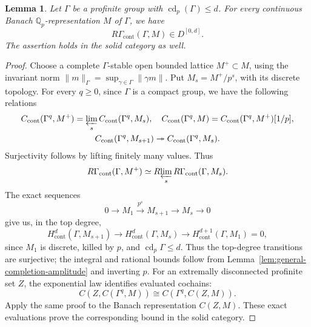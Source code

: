 \documentclass[11pt]{article}
\newtheorem{lemma}[theorem]{Lemma}
\theoremstyle{definition}
\newcommand{\Qp}{\mathbb Q_p}
\begin{document}
\begin{lemma}%
\label{lem:general-Banach-group-dimension}
Let \(\Gamma\) be a profinite group with
\(\operatorname{cd}_p(\Gamma)\leq d\).
For every continuous Banach \(\Qp\)-representation \(M\) of $\Gamma$,
we have 
\[
 R\Gamma_{\mathrm{cont}}(\Gamma,M)\in D^{[0,d]}.
\]
The assertion holds in the solid category as well.
\end{lemma}
\begin{proof}
Choose a complete \(\Gamma\)-stable open bounded lattice
\(M^+\subset M\), using the invariant norm
\(\|m\|_\Gamma=\sup_{\gamma\in\Gamma}\|\gamma m\|\).
Put \(M_s=M^+/p^s\), with its discrete topology.
For every \(q\geq0\), since $\Gamma$ is a compact group, we have the following relations
\begin{gather*}
 C_{\mathrm{cont}}(\Gamma^q,M^+)
 =\varprojlim_s C_{\mathrm{cont}}(\Gamma^q,M_s),\quad
 C_{\mathrm{cont}}(\Gamma^q,M)
 =C_{\mathrm{cont}}(\Gamma^q,M^+)[1/p],\\
 C_{\mathrm{cont}}(\Gamma^q,M_{s+1})
 \twoheadrightarrow C_{\mathrm{cont}}(\Gamma^q,M_s).
\end{gather*}
Surjectivity follows by lifting finitely many values.  Thus
\[
 R\Gamma_{\mathrm{cont}}(\Gamma,M^+)
 \simeq R\!\varprojlim_s R\Gamma_{\mathrm{cont}}(\Gamma,M_s).
\]
The exact sequences
\[
 0\longrightarrow M_1\xrightarrow{p^s}M_{s+1}
 \longrightarrow M_s\longrightarrow0
\]
give us, in the top degree,
\[
 H^d_{\mathrm{cont}}(\Gamma,M_{s+1})
 \longrightarrow H^d_{\mathrm{cont}}(\Gamma,M_s)
 \longrightarrow H^{d+1}_{\mathrm{cont}}(\Gamma,M_1)=0,
\]
since \(M_1\) is discrete, killed by \(p\), and
\(\operatorname{cd}_p\Gamma\leq d\).
Thus the top-degree transitions are surjective; the integral
and rational bounds follow from
Lemma~\ref{lem:general-completion-amplitude} and inverting $p$.
For an extremally disconnected profinite set \(Z\),
the exponential law identifies evaluated cochains:
\[
 C(Z,C(\Gamma^q,M))\cong C(\Gamma^q,C(Z,M)).
\]
Apply the same proof to the Banach representation \(C(Z,M)\).
These exact evaluations prove the corresponding bound in the solid category.
\end{proof}
\end{document}

